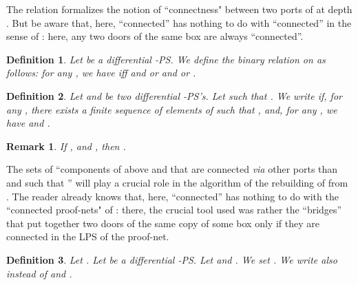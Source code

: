 \documentclass{article}
\theoremstyle{plain}
\newtheorem{definition}{Definition}
\newtheorem{rem}{Remark}
\begin{document}
\begin{comment}
\begin{proof}
By Fact~\ref{fact: sqsubseteq}, we already know that there exists a differential ground-structure  such that  and . We set , where  is a function that associates with every  the function: 
\end{proof}
\end{comment}




The relation  formalizes the notion of ``connectness" between two ports of  at depth . But be aware that, here, ``connected'' has nothing to do with ``connected'' in the sense of \cite{LPSinjectivity}: here, any two doors of the same box are always ``connected''.

\begin{definition}
Let  be a differential -PS. We define the binary relation  on  as follows: for any , we have  iff  and  or  and  or .
\end{definition}

\begin{definition}\label{defin: connected substructure}
Let  and  be two differential -PS's. Let  such that . We write  if, for any , there exists a finite sequence  of elements of  such that ,  and, for any , we have  and .
\end{definition}

\begin{rem}
If ,  and , then .
\end{rem}

The sets  of ``components  of  above  and  that are connected \emph{via} other ports than  and such that '' will play a crucial role in the algorithm of the rebuilding of  from . The reader already knows that, here, ``connected'' has nothing to do with the ``connected proof-nets" of \cite{LPSinjectivity}: there, the crucial tool used was rather the ``bridges'' that put together two doors of the same copy of some box only if they are connected in the LPS of the proof-net.

\begin{definition}\label{defin: connected components}
Let . 
Let  be a differential -PS. Let  and . We set 
. 
We write also  instead of  and .
\end{definition}

\begin{comment}
\begin{rem}
We have .
\end{rem}

\begin{rem}\label{remark: nonrivialconnected}
If  and , then .
\end{rem}
\end{comment}
\end{document}
